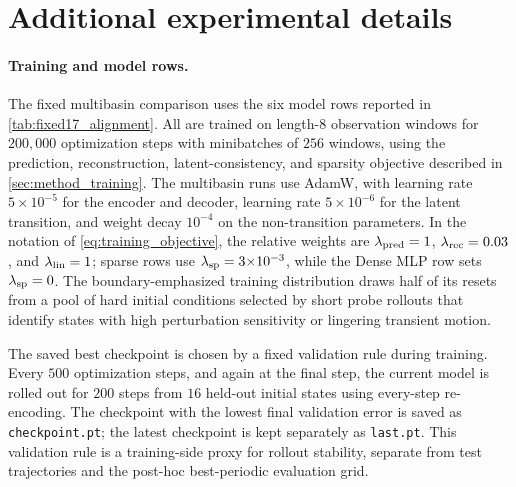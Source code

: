 \section{Additional experimental details}
\label{app:experimental_details}

\paragraph{Training and model rows.}
The fixed multibasin comparison uses the six model rows reported in \cref{tab:fixed17_alignment}. All are trained on length-$8$ observation windows for $200{,}000$ optimization steps with minibatches of $256$ windows, using the prediction, reconstruction, latent-consistency, and sparsity objective described in \cref{sec:method_training}. The multibasin runs use AdamW, with learning rate $5{\times}10^{-5}$ for the encoder and decoder, learning rate $5{\times}10^{-6}$ for the latent transition, and weight decay $10^{-4}$ on the non-transition parameters. In the notation of \cref{eq:training_objective}, the relative weights are $\lambda_{\rm pred}=1$, $\lambda_{\rm rec}=0.03$, and $\lambda_{\rm lin}=1$; sparse rows use $\lambda_{\rm sp}=3{\times}10^{-3}$, while the Dense MLP row sets $\lambda_{\rm sp}=0$. The boundary-emphasized training distribution draws half of its resets from a pool of hard initial conditions selected by short probe rollouts that identify states with high perturbation sensitivity or lingering transient motion.

The saved best checkpoint is chosen by a fixed validation rule during training. Every $500$ optimization steps, and again at the final step, the current model is rolled out for $200$ steps from $16$ held-out initial states using every-step re-encoding. The checkpoint with the lowest final validation error is saved as \texttt{checkpoint.pt}; the latest checkpoint is kept separately as \texttt{last.pt}. This validation rule is a training-side proxy for rollout stability, separate from test trajectories and the post-hoc best-periodic evaluation grid.

